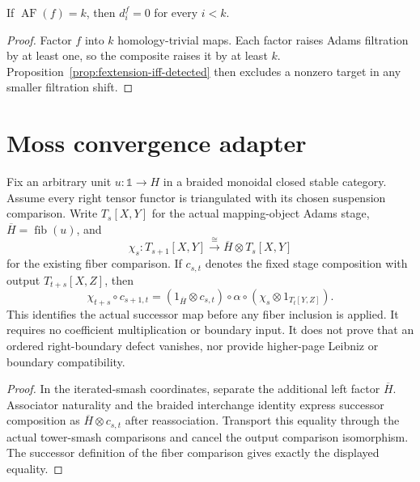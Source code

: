 \begin{corollary}
  \label{cor:fess-below-map-filtration-zero}
  \notready
  If $\operatorname{AF}(f)=k$, then $d_i^f=0$ for every $i<k$.
\end{corollary}

\begin{proof}
  Factor $f$ into $k$ homology-trivial maps.  Each factor raises Adams
  filtration by at least one, so the composite raises it by at least $k$.
  Proposition~\ref{prop:fextension-iff-detected} then excludes a nonzero
  target in any smaller filtration shift.
\end{proof}

\section{Moss convergence adapter}

\begin{proposition}
  \label{prop:moss-stage-composition-successor}
  \leanok
  Fix an arbitrary unit $u:\mathbb 1\to H$ in a braided monoidal closed
  stable category.  Assume every right tensor functor is triangulated with
  its chosen suspension comparison.  Write $T_s[X,Y]$ for the actual
  mapping-object Adams stage, $\overline H=\operatorname{fib}(u)$, and
  \[
    \chi_s:T_{s+1}[X,Y]\xrightarrow{\ \cong\ }
      \overline H\otimes T_s[X,Y]
  \]
  for the existing fiber comparison.  If $c_{s,t}$ denotes the fixed
  stage composition with output $T_{t+s}[X,Z]$, then
  \[
    \chi_{t+s}\circ c_{s+1,t}
      =(1_{\overline H}\otimes c_{s,t})\circ\alpha
        \circ(\chi_s\otimes1_{T_t[Y,Z]}).
  \]
  This identifies the actual successor map before any fiber inclusion is
  applied.  It requires no coefficient multiplication or boundary input.
  It does not prove that an ordered right-boundary defect vanishes, nor
  provide higher-page Leibniz or boundary compatibility.
\end{proposition}
\begin{proof}
  \leanok
  In the iterated-smash coordinates, separate the additional left factor
  $\overline H$.  Associator naturality and the braided interchange
  identity express successor composition as
  $\overline H\otimes c_{s,t}$ after reassociation.  Transport this
  equality through the actual tower-smash comparisons and cancel the
  output comparison isomorphism.  The successor definition of the fiber
  comparison gives exactly the displayed equality.
\end{proof}

